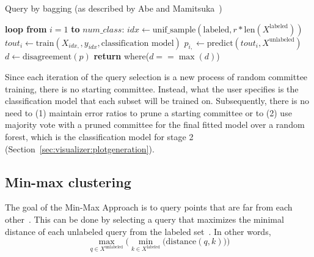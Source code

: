 \tablespacing
\begin{algorithm}[H]
	\caption{Query by bagging (as described by Abe and 
	Mamitsuka~\cite{abe1998})}\label{alg:al:methods:bagging}
	\begin{algorithmic}[1]
		\State \textbf{loop from} $i=1$ \textbf{to} $num\_class$:
		\State \indent $idx \gets \text{unif\_sample}(\text{labeled}, 
		r*\text{len}(X^{\text{labeled}}) )$
		\State \indent $\textit{tout}_{i} \gets 
		\text{train}(X_{idx, },y_{idx},\text{classification model})$
		\State \indent $p_{i,} \gets 
		\text{predict}(\textit{tout}_i,X^{\text{unlabeled}})$
		\State $d \gets \text{disagreement}(p)$
		\State \textbf{return} where($d==\max{(d)}$)
		\EndProcedure
	\end{algorithmic}
\end{algorithm}
\bodyspacing

\noindent Since each iteration of the query selection is a new process of 
random committee training, there is no starting committee. Instead, what the 
user specifies is the classification model that each subset will be trained on. 
Subsequently, there is no need to (1) maintain error ratios to prune a starting 
committee or to (2) use majority vote with a pruned committee for the final 
fitted model over a random forest, which is the classification model for stage 
2 (Section~\ref{sec:visualizer:plotgeneration}).










\subsection{Min-max clustering}
\label{sec:al:methods:clustering}

The goal of the Min-Max Approach is to query points that are far from each 
other~\cite{vu2010}. This can be done by selecting a query that maximizes the 
minimal distance of each unlabeled query from the labeled set~\cite{vu2010}. 
In other words, 
$$\max\limits_{q \in X^{\text{unlabeled}}} \bigg( \min\limits_{k \in 
X^{\text{labeled}}} \bigg( \text{distance}(q,k) \bigg) \bigg)$$

